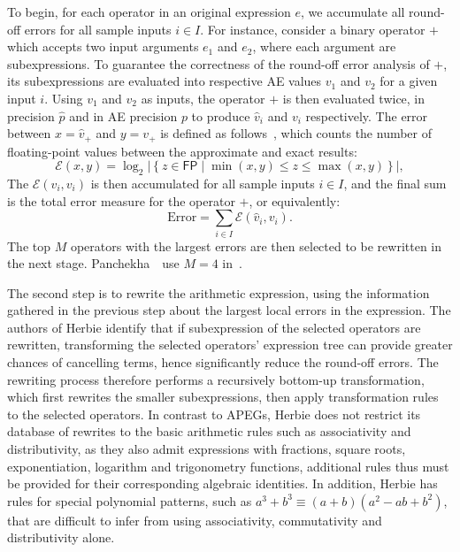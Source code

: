 To begin, for each operator in an original expression $e$, we accumulate all
round-off errors for all sample inputs $i \in I$.  For instance, consider
a binary operator $+$ which accepts two input arguments $e_1$ and $e_2$,
where each argument are subexpressions.  To guarantee the correctness of
the round-off error analysis of $+$, its subexpressions are evaluated
into respective AE values $v_1$ and $v_2$ for a given input $i$.  Using
$v_1$ and $v_2$ as inputs, the operator $+$ is then evaluated twice,
in precision $\hat{p}$ and in AE precision $p$ to produce $\hat{v}_i$
and $v_i$ respectively.  The error between $x = \hat{v}_+$ and $y =
v_+$ is defined as follows~\cite{panchekha15, schkufza14}, which counts
the number of floating-point values between the approximate and exact
results\footnotemark[4]:
\begin{equation}
    \mathcal{E}(x, y) = \log_2 \left| \left\{
        z \in \mathsf{FP} \mid \min(x, y) \leq z \leq \max(x, y)
    \right\} \right|,
\end{equation}
The $\mathcal{E}(\hat{v}_i, v_i)$ is then accumulated for all sample inputs $i
\in I$, and the final sum is the total error measure for the operator $+$, or
equivalently:
\begin{equation}
    \mathrm{Error} = \sum_{i \in I} \mathcal{E}(\hat{v}_i, v_i).
\end{equation}
The top $M$ operators with the largest errors are then selected to be rewritten
in the next stage.  Panchekha~\etal~use $M = 4$ in~\cite{panchekha15}.

The second step is to rewrite the arithmetic expression, using the information
gathered in the previous step about the largest local errors in the expression.
The authors of Herbie identify that if subexpression of the selected operators
are rewritten, transforming the selected operators' expression tree can provide
greater chances of cancelling terms, hence significantly reduce the round-off
errors.  The rewriting process therefore performs a recursively bottom-up
transformation, which first rewrites the smaller subexpressions, then apply
transformation rules to the selected operators.  In contrast to APEGs, Herbie
does not restrict its database of rewrites to the basic arithmetic rules such
as associativity and distributivity, as they also admit expressions with
fractions, square roots, exponentiation, logarithm and trigonometry functions,
additional rules thus must be provided for their corresponding algebraic
identities.  In addition, Herbie has rules for special polynomial patterns,
such as $a^3 + b^3 \equiv (a + b)(a^2 - ab + b^2)$, that are difficult to infer
from using associativity, commutativity and distributivity alone.

